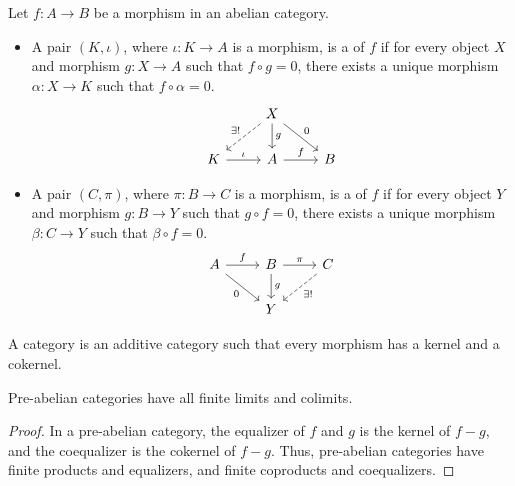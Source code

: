 \documentclass[main.tex]{subfiles}
\begin{document}
\begin{definition}
  \label{def:kernel_cokernel}
  Let $f\colon A \to B$ be a morphism in an abelian category.
  \begin{itemize}
    \item A pair $(K, \iota)$, where $\iota\colon K \to A$ is a morphism, is a  of $f$ if for every object $X$ and morphism $g\colon X \to A$ such that $f \circ g = 0$, there exists a unique morphism $\alpha\colon X \to K$ such that $f \circ \alpha = 0$.
      \begin{equation*}
        \begin{tikzcd}
          & X
          \arrow[d, "g"]
          \arrow[dr, "0"]
          \arrow[dl, swap, dashed, "\exists!"]
          \\
          K
          \arrow[r, "\iota"]
          & A
          \arrow[r, "f"]
          & B
        \end{tikzcd}
      \end{equation*}

    \item A pair $(C, \pi)$, where $\pi\colon B \to C$ is a morphism, is a  of $f$ if for every object $Y$ and morphism $g\colon B \to Y$ such that $g \circ f = 0$, there exists a unique morphism $\beta\colon C \to Y$ such that $\beta \circ f = 0$.
      \begin{equation*}
        \begin{tikzcd}
          A
          \arrow[r, "f"]
          \arrow[dr, swap, "0"]
          & B
          \arrow[r, "\pi"]
          \arrow[d, "g"]
          & C
          \arrow[dl, dashed, "\exists!"]
          \\
          & Y
        \end{tikzcd}
      \end{equation*}
  \end{itemize}
\end{definition}

\begin{definition}
  \label{def:pre_abelian_category}
  A  category is an additive category such that every morphism has a kernel and a cokernel.
\end{definition}

\begin{lemma}
  \label{lemma:pre_abelian_categories_have_finite_limits_and_colimits}
  Pre-abelian categories have all finite limits and colimits.
\end{lemma}
\begin{proof}
  In a pre-abelian category, the equalizer of $f$ and $g$ is the kernel of $f-g$, and the coequalizer is the cokernel of $f-g$. Thus, pre-abelian categories have finite products and equalizers, and finite coproducts and coequalizers.
\end{proof}
\end{document}
